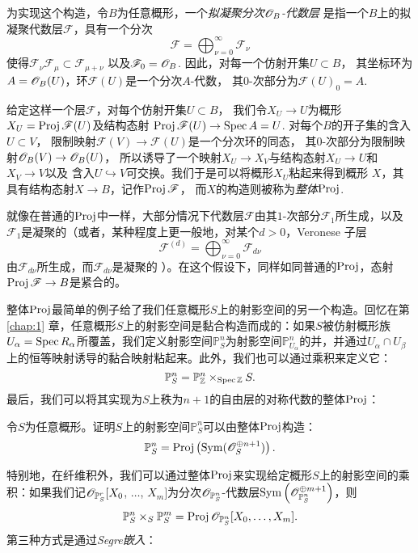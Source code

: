 为实现这个构造，令$B$为任意概形，一个\textit{拟凝聚分次$\mathscr{O}_B$-代数层}
是指一个$B$上的拟凝聚代数层$\mathscr F$，具有一个分次
\[
	\mathscr F=\bigoplus_{\nu=0}^\infty \mathscr F_\nu
\]
使得$\mathscr F_\nu \mathscr F_\mu\subset \mathscr F_{\mu+\nu}$
以及$\mathscr F_0=\mathscr{O}_B$. 因此，对每一个仿射开集$U\subset B$，
其坐标环为$A=\mathscr{O}_B(U)$，环$\mathscr{F}(U)$是一个分次$A$-代数，
其$0$-次部分为$\mathscr F(U)_0=A$. 

给定这样一个层$\mathscr F$，对每个仿射开集$U\subset B$，
我们令$X_U\to U$为概形$X_U=\operatorname{Proj} \mathscr F(U)$及结构态射
$\operatorname{Proj} \mathscr F(U)\to \operatorname{Spec} A=U$. 对每个$B$的开子集的含入$U\subset V$，
限制映射$\mathscr F(V)\to \mathscr F(U)$是一个分次环的同态，
其$0$-次部分为限制映射$\mathscr{O}_B(V)\to \mathscr{O}_B(U)$，
所以诱导了一个映射$X_U\to X_V$与结构态射$X_U\to U$和$X_V\to V$以及
含入$U\hookrightarrow V$可交换。我们于是可以将概形$X_U$粘起来得到概形
$X$，其具有结构态射$X\to B$，记作$\operatorname{Proj} \mathscr F$，
而$X$的构造则被称为\textit{整体$\operatorname{Proj}$}.

就像在普通的$\operatorname{Proj}$中一样，大部分情况下代数层$\mathscr F$由其$1$-次部分$\mathscr F_1$所生成，以及$\mathscr F_1$是凝聚的（或者，某种程度上更一般地，对某个$d>0$，Veronese 子层
\[
	\mathscr F^{(d)}=\bigoplus_{\nu=0}^\infty \mathscr F_{d\nu}
\]
由$\mathscr F_{d\nu}$所生成，而$\mathscr F_{d\nu}$是凝聚的
）。在这个假设下，同样如同普通的$\operatorname{Proj}$，态射$\operatorname{Proj} \mathscr F\to B$是紧合的。

整体$\operatorname{Proj}$最简单的例子给了我们任意概形$S$上的射影空间的另一个构造。回忆在第 \ref{chap:1} 章，任意概形$S$上的射影空间是黏合构造而成的：如果$S$被仿射概形族$U_\alpha=\operatorname{Spec} R_\alpha$所覆盖，我们定义射影空间$\mathbb P_S^n$为射影空间$\mathbb P_{U_\alpha}^n$的并，并通过$U_\alpha\cap U_\beta$上的恒等映射诱导的黏合映射粘起来。此外，我们也可以通过乘积来定义它：
\[
	\mathbb P_S^n=\mathbb P_{\mathbb Z}^n\times_{\operatorname{Spec} \mathbb Z}S.
\]
最后，我们可以将其实现为$S$上秩为$n+1$的自由层的对称代数的整体$\operatorname{Proj}$：

\begin{exe}\label{exe:3.22}
令$S$为任意概形。证明$S$上的射影空间$\mathbb P_S^n$可以由整体$\operatorname{Proj}$构造：
\[
	\mathbb P_S^n=\operatorname{Proj} \left(\operatorname{Sym}(\mathscr{O}_S^{\oplus n+1})\right).
\]
\end{exe}

特别地，在纤维积外，我们可以通过整体$\operatorname{Proj}$来实现给定概形$S$上的射影空间的乘积：如果我们记$\mathscr{O}_{\mathbb P_S^r}[X_0$, $\dots$, $X_m]$为分次$\mathscr{O}_{\mathbb P_S^n}$-代数层$\operatorname{Sym}\left(\mathscr{O}_{\mathbb P_S^n}^{\oplus m+1}\right)$，则
\[
	\mathbb P^n_S\times_S \mathbb P^m_S=\operatorname{Proj} \mathscr{O}_{\mathbb P^n_S}[X_0,\dots,X_m].
\]
第三种方式是通过\textit{Segre嵌入}：

